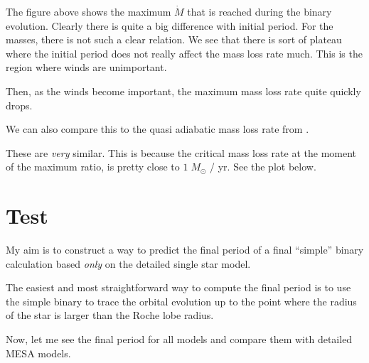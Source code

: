 \documentclass[a4paper,11pt]{article}
\begin{document}
\begin{figure}[ht]
	\centering
\end{figure}

The figure above shows the maximum \(\dot{M}\) that is reached during the binary evolution.
Clearly there is quite a big difference with initial period.
For the masses, there is not
such a clear relation.
We see that there is sort of plateau where the initial period does not
really affect the mass loss rate much.
This is the region where winds are unimportant.

Then, as the winds become important, the maximum mass loss rate quite quickly drops.

We can also compare this to the quasi adiabatic mass loss rate from \citet{temmink2022}.

\begin{figure}[ht]
	\centering
\end{figure}

These are \emph{very} similar.
This is because the critical mass loss rate at the moment of the
maximum ratio, is pretty close to \(1\; M_\odot \) / yr.
See the plot below.

\nextpage

\begin{figure}[ht]
	\centering
\end{figure}

\section{Test}

My aim is to construct a way to predict the final period of a final ``simple'' binary calculation
based \emph{only} on the detailed single star model.

The easiest and most straightforward way to compute the final period is to use the simple binary
to trace the orbital evolution up to the point where the radius of the star is larger than the Roche lobe
radius.

\begin{figure}[ht]
	\centering
\end{figure}

Now, let me see the final period for all models and compare them with detailed MESA models.

\begin{figure}[ht]
	\centering
\end{figure}
\end{document}
